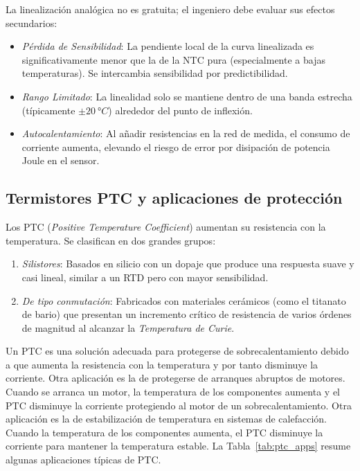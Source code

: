 La linealización analógica no es gratuita; el ingeniero debe evaluar sus efectos secundarios:

\begin{itemize}
    \item \emph{Pérdida de Sensibilidad}: La pendiente local de la curva linealizada es significativamente menor que la de la NTC pura (especialmente a bajas temperaturas). Se intercambia sensibilidad por predictibilidad.
    \item \emph{Rango Limitado}: La linealidad solo se mantiene dentro de una banda estrecha (típicamente $\pm \qty{20}{\degree C}$) alrededor del punto de inflexión.
    \item \emph{Autocalentamiento}: Al añadir resistencias en la red de medida, el consumo de corriente aumenta, elevando el riesgo de error por disipación de potencia Joule en el sensor.
\end{itemize}

\subsection{Termistores PTC y aplicaciones de protección}

Los PTC (\textit{Positive Temperature Coefficient}) aumentan su resistencia con la temperatura. Se clasifican en dos grandes grupos:
\begin{enumerate}
    \item \emph{Silistores}: Basados en silicio con un dopaje que produce una respuesta suave y casi lineal, similar a un RTD pero con mayor sensibilidad.
    \item \emph{De tipo conmutación}: Fabricados con materiales cerámicos (como el titanato de bario) que presentan un incremento crítico de resistencia de varios órdenes de magnitud al alcanzar la \emph{Temperatura de Curie}.
\end{enumerate}

Un PTC es una solución adecuada para protegerse de sobrecalentamiento debido a que aumenta la resistencia con la temperatura y por tanto disminuye la corriente. Otra aplicación es la de protegerse de arranques abruptos de motores. Cuando se arranca un motor, la temperatura de los componentes aumenta y el PTC disminuye la corriente protegiendo al motor de un sobrecalentamiento. Otra aplicación es la de estabilización de temperatura en sistemas de calefacción. Cuando la temperatura de los componentes aumenta, el PTC disminuye la corriente para mantener la temperatura estable. La Tabla~\ref{tab:ptc_apps} resume algunas aplicaciones típicas de PTC.

